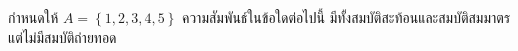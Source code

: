 ﻿%
\question กำหนดให้ $A=\left\{1,2,3,4,5\right\} $ ความสัมพันธ์ในข้อใดต่อไปนี้ มีทั้งสมบัติสะท้อนและสมบัติสมมาตร แต่ไม่มีสมบัติถ่ายทอด
\newline
{}
